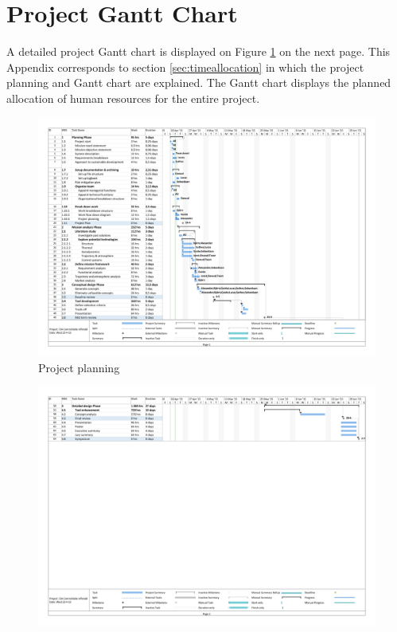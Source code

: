 \section{Project Gantt Chart}

A detailed project Gantt chart is displayed on Figure \ref{fig:GanttChart} on the next page. This Appendix corresponds to section \ref{sec:timeallocation} in which the project planning and Gantt chart are explained. The Gantt chart displays the planned allocation of human resources for the entire project.

\begin{figure}
    \includegraphics[scale=0.6]{Figure/1_GanttChart.pdf}
    \caption{Project planning}
    \label{fig:GanttChart}
\end{figure}

\begin{figure}
    \includegraphics[scale=0.6]{Figure/2_GanttChart.pdf}
\end{figure}
